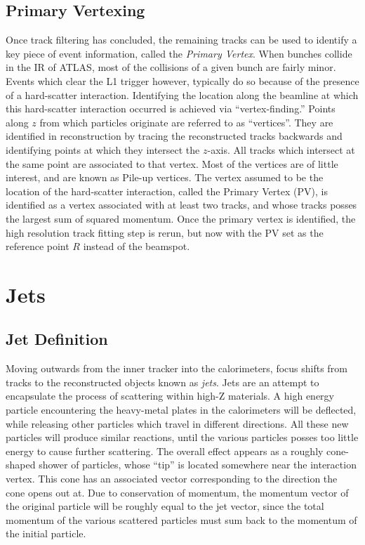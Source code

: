         \subsection{Primary Vertexing}

            Once track filtering has concluded,
                the remaining tracks can be used to identify a key piece of event information, 
                called the \textit{Primary Vertex}.
            When bunches collide in the IR of ATLAS, most of the collisions of a given bunch are fairly minor.
            Events which clear the L1 trigger however, typically do so because of the presence of a hard-scatter interaction. %
            Identifying the location along the beamline at which this hard-scatter interaction occurred is achieved via ``vertex-finding.''
            Points along $z$ from which particles originate are referred to as ``vertices''.
            They are identified in reconstruction by tracing the reconstructed tracks backwards
                and identifying points at which they intersect the $z$-axis.
            All tracks which intersect at the same point are associated to that vertex.
            Most of the vertices are of little interest, and are known as Pile-up vertices.
            The vertex assumed to be the location of the hard-scatter interaction, called the Primary Vertex (PV),
                is identified as a vertex associated with at least two tracks,
                and whose tracks posses the largest sum of squared momentum\cite{jet_energy_scale13TeV}.
            Once the primary vertex is identified, the high resolution track fitting step is rerun,
                but now with the PV set as the reference point $R$ instead of the beamspot.


    \section{Jets}

        \subsection{Jet Definition}

        Moving outwards from the inner tracker into the calorimeters, focus shifts from tracks to the reconstructed objects known as \textit{jets}.
        Jets are an attempt to encapsulate the process of scattering within high-Z materials.
        A high energy particle encountering the heavy-metal plates in the calorimeters will be deflected,
            while releasing other particles which travel in different directions.
        All these new particles will produce similar reactions, until the various particles posses too little energy to cause further scattering.
        The overall effect appears as a roughly cone-shaped shower of particles,
            whose ``tip'' is located somewhere near the interaction vertex.
        This cone has an associated vector corresponding to the direction the cone opens out at.
        Due to conservation of momentum, the momentum vector of the original particle will be roughly equal to the jet vector,
            since the total momentum of the various scattered particles must sum back to the momentum of the initial particle.

